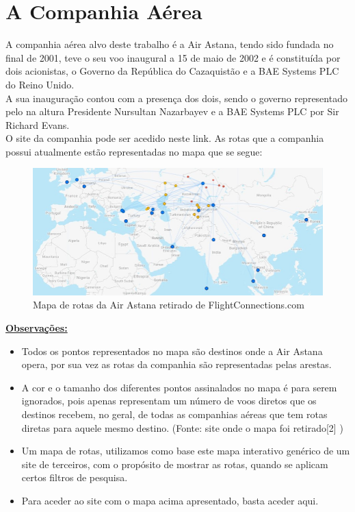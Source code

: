 \chapter{A Companhia Aérea}
\label{chapter:Companhia Aérea}
A companhia aérea alvo deste trabalho é a Air Astana, tendo sido fundada no final de 2001, teve o seu voo
inaugural a 15 de maio de 2002 e é constituída por dois acionistas, o Governo da República do Cazaquistão e a 
BAE Systems PLC do Reino Unido.\\
A sua inauguração contou com a presença dos dois, sendo o governo 
representado pelo na altura Presidente Nursultan Nazarbayev e a BAE Systems PLC por Sir Richard Evans.\\
O site da companhia pode ser acedido neste link.
As rotas que a companhia possui atualmente estão representadas no mapa que se segue:

\begin{figure}[h]
        \centering
        \includegraphics[width=1\textwidth]{imgs/Figura1}
        \caption{Mapa de rotas da Air Astana retirado de FlightConnections.com\label{fig:imagem1}}
\end{figure}

\noindent\underline{\textbf{Observações:}}\\
\begin{itemize}
\item Todos os pontos representados no mapa são destinos onde a Air Astana opera, por sua vez as rotas da
companhia são representadas pelas arestas.
\item A cor e o tamanho dos diferentes pontos assinalados no mapa é para serem ignorados, pois apenas
representam um número de voos diretos que os destinos recebem, no geral, de todas as companhias aéreas 
que tem rotas diretas para aquele mesmo destino. (Fonte: site onde o mapa foi retirado[2]
)
\item Um mapa de rotas, utilizamos como base este mapa interativo genérico de um site de terceiros, com o
propósito de mostrar as rotas, quando se aplicam certos filtros de pesquisa.
\item Para aceder ao site com o mapa acima apresentado, basta aceder aqui.
\end{itemize}
\clearpage
